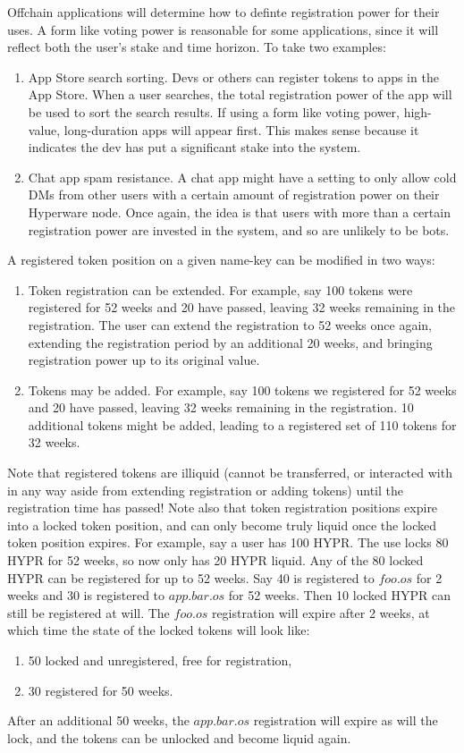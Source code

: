 \documentclass{article}
\begin{document}
Offchain applications will determine how to definte registration power for their uses.
A form like voting power is reasonable for some applications, since it will reflect both the user's stake and time horizon.
To take two examples:
\begin{enumerate}
	\item App Store search sorting.
		Devs or others can register tokens to apps in the App Store.
		When a user searches, the total registration power of the app will be used to sort the search results.
		If using a form like voting power, high-value, long-duration apps will appear first.
		This makes sense because it indicates the dev has put a significant stake into the system.
	\item Chat app spam resistance.
		A chat app might have a setting to only allow cold DMs from other users with a certain amount of registration power on their Hyperware node.
		Once again, the idea is that users with more than a certain registration power are invested in the system, and so are unlikely to be bots.
\end{enumerate}

A registered token position on a given name-key can be modified in two ways:
\begin{enumerate}
    \item Token registration can be extended.
       For example, say 100 tokens were registered for 52 weeks and 20 have passed, leaving 32 weeks remaining in the registration.
       The user can extend the registration to 52 weeks once again, extending the registration period by an additional 20 weeks, and bringing registration power up to its original value.
    \item Tokens may be added.
       For example, say 100 tokens we registered for 52 weeks and 20 have passed, leaving 32 weeks remaining in the registration.
       10 additional tokens might be added, leading to a registered set of 110 tokens for 32 weeks.
\end{enumerate}

Note that registered tokens are illiquid (cannot be transferred, or interacted with in any way aside from extending registration or adding tokens) until the registration time has passed!
Note also that token registration positions expire into a locked token position, and can only become truly liquid once the locked token position expires.
For example, say a user has 100 HYPR.
The use locks 80 HYPR for 52 weeks, so now only has 20 HYPR liquid.
Any of the 80 locked HYPR can be registered for up to 52 weeks.
Say 40 is registered to $foo.os$ for 2 weeks and 30 is registered to $app.bar.os$ for 52 weeks.
Then 10 locked HYPR can still be registered at will.
The $foo.os$ registration will expire after 2 weeks, at which time the state of the locked tokens will look like:
\begin{enumerate}
    \item 50 locked and unregistered, free for registration,
    \item 30 registered for 50 weeks.
\end{enumerate}
After an additional 50 weeks, the $app.bar.os$ registration will expire as will the lock, and the tokens can be unlocked and become liquid again.
\end{document}
